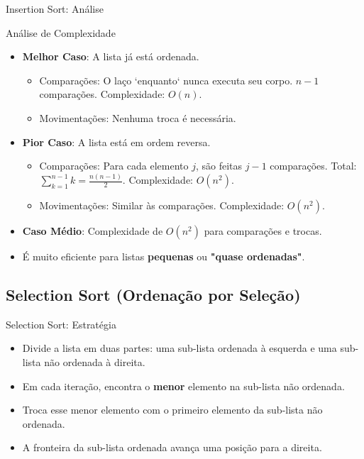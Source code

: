 \documentclass{beamer}
\begin{document}
\begin{frame}{Insertion Sort: Análise}
\begin{block}{Análise de Complexidade}
\begin{itemize}
    \item \textbf{Melhor Caso}: A lista já está ordenada.
    \begin{itemize}
        \item Comparações: O laço `enquanto` nunca executa seu corpo. $n-1$ comparações. Complexidade: $O(n)$.
        \item Movimentações: Nenhuma troca é necessária.
    \end{itemize}
    \item \textbf{Pior Caso}: A lista está em ordem reversa.
    \begin{itemize}
        \item Comparações: Para cada elemento $j$, são feitas $j-1$ comparações. Total: $\sum_{k=1}^{n-1} k = \frac{n(n-1)}{2}$. Complexidade: $O(n^2)$.
        \item Movimentações: Similar às comparações. Complexidade: $O(n^2)$.
    \end{itemize}
    \item \textbf{Caso Médio}: Complexidade de $O(n^2)$ para comparações e trocas.
\end{itemize}
\end{block}
\begin{itemize}
\item É muito eficiente para listas \textbf{pequenas} ou \textbf{"quase ordenadas"}.
\end{itemize}
\end{frame}


\subsection{Selection Sort (Ordenação por Seleção)}
\begin{frame}{Selection Sort: Estratégia}
 \begin{itemize}
  \item Divide a lista em duas partes: uma sub-lista ordenada à esquerda e uma sub-lista não ordenada à direita.
  \item Em cada iteração, encontra o \textbf{menor} elemento na sub-lista não ordenada.
  \item Troca esse menor elemento com o primeiro elemento da sub-lista não ordenada.
  \item A fronteira da sub-lista ordenada avança uma posição para a direita.
 \end{itemize}

\end{frame}
\end{document}
